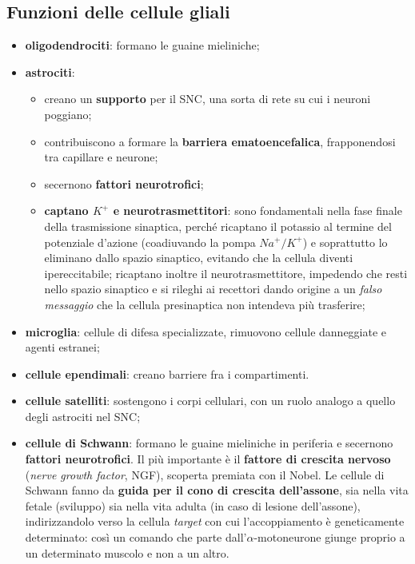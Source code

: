 \subsection{Funzioni delle cellule gliali}

\begin{itemize}
  \item \textbf{oligodendrociti}: formano le guaine mieliniche;
  \item \textbf{astrociti}:
    \begin{itemize}
      \item creano un \textbf{supporto} per il SNC, una sorta di rete su cui i neuroni poggiano;
      \item contribuiscono a formare la \textbf{barriera ematoencefalica}, frapponendosi tra
        capillare e neurone;
      \item secernono \textbf{fattori neurotrofici};
      \item \textbf{captano $K^+$ e neurotrasmettitori}: sono fondamentali nella fase finale della
        trasmissione sinaptica, perché ricaptano il potassio al termine del potenziale d'azione
        (coadiuvando la pompa $Na^+/K^+$) e soprattutto lo eliminano dallo spazio sinaptico,
        evitando che la cellula diventi ipereccitabile; ricaptano inoltre il neurotrasmettitore,
        impedendo che resti nello spazio sinaptico e si rileghi ai recettori dando origine a un
        \textit{falso messaggio} che la cellula presinaptica non intendeva più trasferire;
    \end{itemize}
  \item \textbf{microglia}: cellule di difesa specializzate, rimuovono cellule danneggiate e agenti
    estranei;
  \item \textbf{cellule ependimali}: creano barriere fra i compartimenti.
\end{itemize}

\begin{itemize}
  \item \textbf{cellule satelliti}: sostengono i corpi cellulari, con un ruolo analogo a quello
    degli astrociti nel SNC;
  \item \textbf{cellule di Schwann}: formano le guaine mieliniche in periferia e secernono
    \textbf{fattori neurotrofici}. Il più importante è il \textbf{fattore di crescita nervoso}
    (\textit{nerve growth factor}, NGF), scoperta premiata con il Nobel. Le cellule di Schwann
    fanno da \textbf{guida per il cono di crescita dell'assone}, sia nella vita fetale (sviluppo)
    sia nella vita adulta (in caso di lesione dell'assone), indirizzandolo verso la cellula
    \textit{target} con cui l'accoppiamento è geneticamente determinato: così un comando che parte
    dall'$\alpha$-motoneurone giunge proprio a un determinato muscolo e non a un altro.
\end{itemize}

